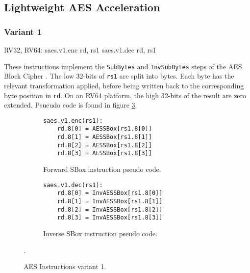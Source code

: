 
\newpage
\subsection{Lightweight AES Acceleration}




\subsubsection{Variant 1}

\begin{cryptoisa}
RV32, RV64:
    saes.v1.enc rd, rs1
    saes.v1.dec rd, rs1
\end{cryptoisa}

These instructions implement the 
{\tt SubBytes} \cite[Section 5.1.1]{nist:fips:197}
and
{\tt InvSubBytes} \cite[Section 5.3.1]{nist:fips:197}
steps of the AES Block Cipher \cite{nist:fips:197}.
The low 32-bits of {\tt rs1} are split into bytes.
Each byte has the relevant transformation applied, before
being written back to the corresponding byte position in {\tt rd}.
On an RV64 platform, the high 32-bits of the result are zero
extended.
Psueudo code is found in figure
\ref{fig:pseudo:aes:v1}.

\begin{figure}
\begin{subfigure}[b]{0.5\textwidth}
\begin{lstlisting}
saes.v1.enc(rs1):
    rd.8[0] = AESSBox[rs1.8[0]]
    rd.8[1] = AESSBox[rs1.8[1]]
    rd.8[2] = AESSBox[rs1.8[2]]
    rd.8[3] = AESSBox[rs1.8[3]]
\end{lstlisting}
\caption{Forward SBox instruction pseudo code.}
\label{fig:pseudo:aes:v1:sub:enc}
\end{subfigure}
\begin{subfigure}[b]{0.5\textwidth}
\begin{lstlisting}
saes.v1.dec(rs1):
    rd.8[0] = InvAESSBox[rs1.8[0]]
    rd.8[1] = InvAESSBox[rs1.8[1]]
    rd.8[2] = InvAESSBox[rs1.8[2]]
    rd.8[3] = InvAESSBox[rs1.8[3]]
\end{lstlisting}
\label{fig:pseudo:aes:v1:sub:dec}
\caption{Inverse SBox instruction pseudo code.}
\end{subfigure}
\caption{AES Instructions variant 1.}
\label{fig:pseudo:aes:v1}.
\end{figure}

